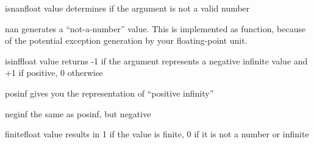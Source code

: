 \begin{funcdesc}{isnan}{float value}
determines if the argument is not a valid number
\end{funcdesc}

\begin{funcdesc}{nan}{}
generates a ``not-a-number'' value. This is implemented as function, because of the potential exception generation by your floating-point unit.
\end{funcdesc}

\begin{funcdesc}{isinf}{float value}
returns -1 if the argument represents a negative infinite value and +1 if positive, 0 otherwise
\end{funcdesc}

\begin{funcdesc}{posinf}{}
gives you the representation of ``positive infinity''
\end{funcdesc}

\begin{funcdesc}{neginf}{}
the same as posinf, but negative
\end{funcdesc}

\begin{funcdesc}{finite}{float value}
results in 1 if the value is finite, 0 if it is not a number or infinite
\end{funcdesc}
